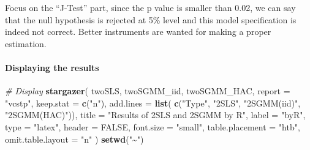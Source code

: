 \documentclass[
  12pt,
]{article}
\newenvironment{Shaded}{\begin{snugshade}}{\end{snugshade}}
\newcommand{\CommentTok}[1]{\textcolor[rgb]{0.56,0.35,0.01}{\textit{#1}}}
\newcommand{\DataTypeTok}[1]{\textcolor[rgb]{0.13,0.29,0.53}{#1}}
\newcommand{\KeywordTok}[1]{\textcolor[rgb]{0.13,0.29,0.53}{\textbf{#1}}}
\newcommand{\NormalTok}[1]{#1}
\newcommand{\OtherTok}[1]{\textcolor[rgb]{0.56,0.35,0.01}{#1}}
\newcommand{\StringTok}[1]{\textcolor[rgb]{0.31,0.60,0.02}{#1}}
\begin{document}
Focus on the ``J-Test'' part, since the p value is smaller than 0.02, we can say that the null hypothesis is rejected at 5\% level and this model specification is indeed not correct. Better instruments are wanted for making a proper estimation.

\hypertarget{displaying-the-results-1}{%
\paragraph{Displaying the results}\label{displaying-the-results-1}}

\begin{Shaded}
\begin{Highlighting}[]
\CommentTok{\# Display}
\KeywordTok{stargazer}\NormalTok{(}
\NormalTok{twoSLS, twoSGMM\_iid, twoSGMM\_HAC,}
\DataTypeTok{report =} \StringTok{"vcstp"}\NormalTok{, }\DataTypeTok{keep.stat =} \KeywordTok{c}\NormalTok{(}\StringTok{"n"}\NormalTok{),}
\DataTypeTok{add.lines =} \KeywordTok{list}\NormalTok{(}
\KeywordTok{c}\NormalTok{(}\StringTok{"Type"}\NormalTok{, }\StringTok{"2SLS"}\NormalTok{, }\StringTok{"2SGMM(iid)"}\NormalTok{, }\StringTok{"2SGMM(HAC)"}\NormalTok{)),}
\DataTypeTok{title =} \StringTok{"Results of 2SLS and 2SGMM by R"}\NormalTok{,}
\DataTypeTok{label =} \StringTok{"byR"}\NormalTok{,}
\DataTypeTok{type =} \StringTok{"latex"}\NormalTok{, }\DataTypeTok{header =} \OtherTok{FALSE}\NormalTok{, }\DataTypeTok{font.size =} \StringTok{"small"}\NormalTok{,}
\DataTypeTok{table.placement =} \StringTok{"htb"}\NormalTok{, }\DataTypeTok{omit.table.layout =} \StringTok{"n"}
\NormalTok{)}
\KeywordTok{setwd}\NormalTok{(}\StringTok{"\textasciitilde{}"}\NormalTok{)}
\end{Highlighting}
\end{Shaded}
\end{document}
